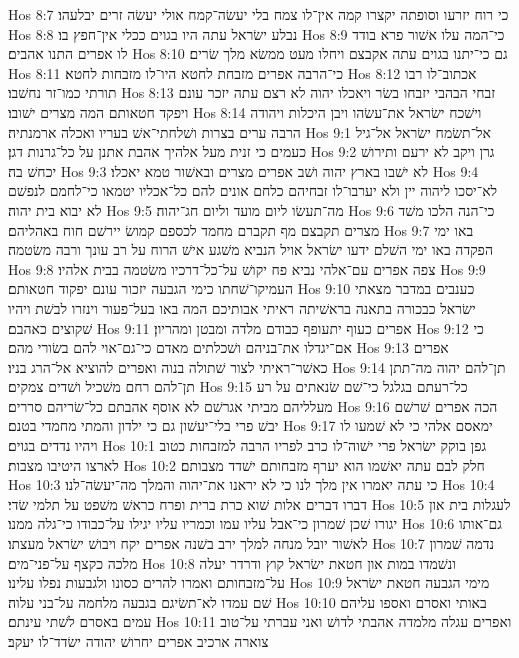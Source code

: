Hos 8:7  כי רוח יזרעו וסופתה יקצרו קמה אין־לו צמח בלי יעשׂה־קמח אולי יעשׂה זרים יבלעהו׃
Hos 8:8  נבלע ישׂראל עתה היו בגוים ככלי אין־חפץ בו׃
Hos 8:9  כי־המה עלו אשׁור פרא בודד לו אפרים התנו אהבים׃
Hos 8:10  גם כי־יתנו בגוים עתה אקבצם ויחלו מעט ממשׂא מלך שׂרים׃
Hos 8:11  כי־הרבה אפרים מזבחת לחטא היו־לו מזבחות לחטא׃
Hos 8:12  אכתוב־לו רבו תורתי כמו־זר נחשׁבו׃
Hos 8:13  זבחי הבהבי יזבחו בשׂר ויאכלו יהוה לא רצם עתה יזכר עונם ויפקד חטאותם המה מצרים ישׁובו׃
Hos 8:14  וישׁכח ישׂראל את־עשׂהו ויבן היכלות ויהודה הרבה ערים בצרות ושׁלחתי־אשׁ בעריו ואכלה ארמנתיה׃
Hos 9:1  אל־תשׂמח ישׂראל אל־גיל כעמים כי זנית מעל אלהיך אהבת אתנן על כל־גרנות דגן׃
Hos 9:2  גרן ויקב לא ירעם ותירושׁ יכחשׁ בה׃
Hos 9:3  לא ישׁבו בארץ יהוה ושׁב אפרים מצרים ובאשׁור טמא יאכלו׃
Hos 9:4  לא־יסכו ליהוה יין ולא יערבו־לו זבחיהם כלחם אונים להם כל־אכליו יטמאו כי־לחמם לנפשׁם לא יבוא בית יהוה׃
Hos 9:5  מה־תעשׂו ליום מועד וליום חג־יהוה׃
Hos 9:6  כי־הנה הלכו משׁד מצרים תקבצם מף תקברם מחמד לכספם קמושׂ יירשׁם חוח באהליהם׃
Hos 9:7  באו ימי הפקדה באו ימי השׁלם ידעו ישׂראל אויל הנביא משׁגע אישׁ הרוח על רב עונך ורבה משׂטמה׃
Hos 9:8  צפה אפרים עם־אלהי נביא פח יקושׁ על־כל־דרכיו משׂטמה בבית אלהיו׃
Hos 9:9  העמיקו־שׁחתו כימי הגבעה יזכור עונם יפקוד חטאותם׃
Hos 9:10  כענבים במדבר מצאתי ישׂראל כבכורה בתאנה בראשׁיתה ראיתי אבותיכם המה באו בעל־פעור וינזרו לבשׁת ויהיו שׁקוצים כאהבם׃
Hos 9:11  אפרים כעוף יתעופף כבודם מלדה ומבטן ומהריון׃
Hos 9:12  כי אם־יגדלו את־בניהם ושׁכלתים מאדם כי־גם־אוי להם בשׂורי מהם׃
Hos 9:13  אפרים כאשׁר־ראיתי לצור שׁתולה בנוה ואפרים להוציא אל־הרג בניו׃
Hos 9:14  תן־להם יהוה מה־תתן תן־להם רחם משׁכיל ושׁדים צמקים׃
Hos 9:15  כל־רעתם בגלגל כי־שׁם שׂנאתים על רע מעלליהם מביתי אגרשׁם לא אוסף אהבתם כל־שׂריהם סררים׃
Hos 9:16  הכה אפרים שׁרשׁם יבשׁ פרי בלי־יעשׁון גם כי ילדון והמתי מחמדי בטנם׃
Hos 9:17  ימאסם אלהי כי לא שׁמעו לו ויהיו נדדים בגוים׃
Hos 10:1  גפן בוקק ישׂראל פרי ישׁוה־לו כרב לפריו הרבה למזבחות כטוב לארצו היטיבו מצבות׃
Hos 10:2  חלק לבם עתה יאשׁמו הוא יערף מזבחותם ישׁדד מצבותם׃
Hos 10:3  כי עתה יאמרו אין מלך לנו כי לא יראנו את־יהוה והמלך מה־יעשׂה־לנו׃
Hos 10:4  דברו דברים אלות שׁוא כרת ברית ופרח כראשׁ משׁפט על תלמי שׂדי׃
Hos 10:5  לעגלות בית און יגורו שׁכן שׁמרון כי־אבל עליו עמו וכמריו עליו יגילו על־כבודו כי־גלה ממנו׃
Hos 10:6  גם־אותו לאשׁור יובל מנחה למלך ירב בשׁנה אפרים יקח ויבושׁ ישׂראל מעצתו׃
Hos 10:7  נדמה שׁמרון מלכה כקצף על־פני־מים׃
Hos 10:8  ונשׁמדו במות און חטאת ישׂראל קוץ ודרדר יעלה על־מזבחותם ואמרו להרים כסונו ולגבעות נפלו עלינו׃
Hos 10:9  מימי הגבעה חטאת ישׂראל שׁם עמדו לא־תשׂיגם בגבעה מלחמה על־בני עלוה׃
Hos 10:10  באותי ואסרם ואספו עליהם עמים באסרם לשׁתי עינתם׃
Hos 10:11  ואפרים עגלה מלמדה אהבתי לדושׁ ואני עברתי על־טוב צוארה ארכיב אפרים יחרושׁ יהודה ישׂדד־לו יעקב׃

